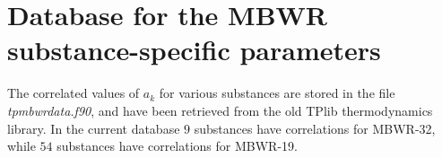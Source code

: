 \documentclass[internal,english]{sintefmemo2012}
\numberwithin{equation}{section}
\begin{document}
% 

\section{Database for the MBWR substance-specific parameters}
The correlated values of $a_k$ for various substances are stored in
the file \textit{tpmbwrdata.f90}, and have been retrieved from the old
TPlib thermodynamics library. In the current database $9$ substances
have correlations for MBWR-32, while $54$ substances have
correlations for MBWR-19.
\end{document}

